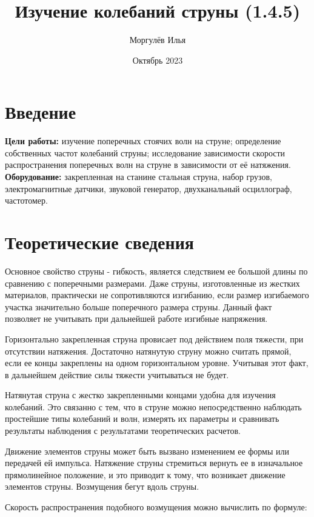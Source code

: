 \documentclass[a4paper,12pt]{article}
\title{\textbf{Изучение колебаний струны (1.4.5)}}
\author{Моргулёв Илья}
\date{Октябрь 2023}
\begin{document}
	
	\maketitle
	
	\section{Введение}
	
	\textbf{Цели работы:} изучение поперечных стоячих волн на струне; определение собственных частот колебаний струны; исследование зависимости скорости распространения поперечных волн на струне в зависимости от её натяжения.\\
	\textbf{Оборудование:} закрепленная на станине стальная струна, набор грузов,
	электромагнитные датчики, звуковой генератор, двухканальный осциллограф, частотомер.
	
	\section{Теоретические сведения}
	
	Основное свойство струны - гибкость, является следствием ее большой длины по сравнению с поперечными размерами. Даже струны, изготовленные из жестких материалов, практически не сопротивляются изгибанию, если размер изгибаемого участка значительно больше поперечного размера струны. Данный факт позволяет не учитывать при дальнейшей работе изгибные напряжения.
	
	Горизонтально закрепленная струна провисает под действием поля тяжести, при отсутствии натяжения. Достаточно натянутую струну можно считать прямой, если ее концы закреплены на одном горизонтальном уровне. Учитывая этот факт, в дальнейшем действие силы тяжести учитываться не будет.
	
	Натянутая струна с жестко закрепленными концами удобна для изучения колебаний. Это связанно с тем, что в струне можно непосредственно наблюдать простейшие типы колебаний и волн, измерять их параметры и сравнивать результаты наблюдения с результатами теоретических расчетов.
	
	Движение элементов струны может быть вызвано изменением ее формы или передачей ей импульса. Натяжение струны стремиться вернуть ее в изначальное прямолинейное положение, и это приводит к тому, что возникает движение элементов струны. Возмущения бегут вдоль струны.
	
	Скорость распространения подобного возмущения можно вычислить по формуле:
	
\end{document}
